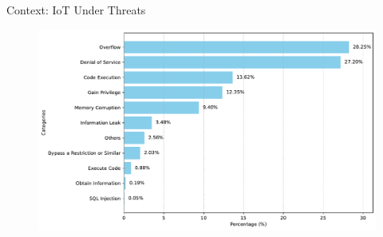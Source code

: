 \begin{frame}{Context: IoT Under Threats}
    \begin{center}
        \begin{minipage}[r]{.55\textwidth}
            \begin{figure}
                \centering
                \includegraphics[width=\textwidth]{src/1_introduction/img/threats_iot_graph.pdf}
            \end{figure}
        \end{minipage}\hspace{.5cm}%
        \begin{minipage}[c]{0.3\textwidth}
        \end{minipage}
    \end{center}
\end{frame}

